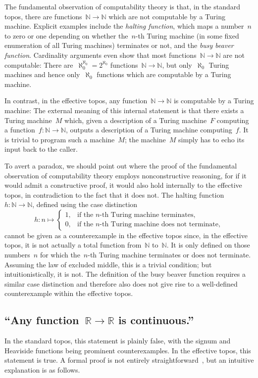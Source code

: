 \documentclass[oneside]{amsart}
\theoremstyle{definition}
\theoremstyle{plain}
\theoremstyle{remark}
\newcommand{\NN}{\mathbb{N}}
\newcommand{\RR}{\mathbb{R}}
\renewcommand{\_}{\mathpunct{.}\,}
\newcommand{\effective}{ef{}fective\xspace}
\newcommand{\?}{\,{:}\,}
\begin{document}
The fundamental observation of computability theory is that, in the standard
topos, there are functions~$\NN \to \NN$ which are not computable by a Turing
machine. Explicit examples include the \emph{halting
function}, which maps a number~$n$ to zero or one depending on whether
the~$n$-th Turing machine (in some fixed enumeration of all Turing machines)
terminates or not, and the \emph{busy beaver function}. Cardinality arguments
even show that most functions~$\NN \to \NN$ are not computable: There
are~$\aleph_0^{\aleph_0} = 2^{\aleph_0}$ functions~$\NN \to \NN$, but
only~$\aleph_0$ Turing machines and hence only~$\aleph_0$ functions which are
computable by a Turing machine.

In contrast, in the \effective topos, any function~$\NN \to \NN$ is computable
by a Turing machine: The external meaning of this internal statement is that
there exists a Turing machine~$M$ which, given a description of a Turing
machine~$F$ computing a function~$f : \NN \to \NN$, outputs a description of a
Turing machine computing~$f$. It is trivial to program such a machine~$M$; the
machine~$M$ simply has to echo its input back to the caller.

To avert a paradox, we should point out where the proof of the fundamental
observation of computability theory employs nonconstructive reasoning, for if
it would admit a constructive proof, it would also hold internally to the
\effective topos, in contradiction to the fact that it does not. The halting
function~$h : \NN \to \NN$, defined using the case distinction
\[ h : n \mapsto \begin{cases}
  1, & \text{if the $n$-th Turing machine terminates}, \\
  0, & \text{if the $n$-th Turing machine does not terminate},
\end{cases} \]
cannot be given as a counterexample in the \effective topos since, in the
\effective topos, it is not actually a total function from~$\NN$ to~$\NN$. It
is only defined on those numbers~$n$ for which the~$n$-th Turing machine
terminates or does not terminate. Assuming the law of excluded middle, this is
a trivial condition; but intuitionistically, it is not. The definition of the
busy beaver function requires a similar case distinction and therefore also
does not give rise to a well-defined counterexample within the \effective
topos.


\subsection{``Any function~$\RR \to \RR$ is continuous.''}\label{sect:eff-continuous}
In the standard topos, this statement is plainly false, with the signum and Heaviside functions
being prominent counterexamples. In the \effective topos, this statement is
true. A formal proof is not entirely straightforward~\cite{XXX}, but an intuitive
explanation is as follows.
\end{document}

